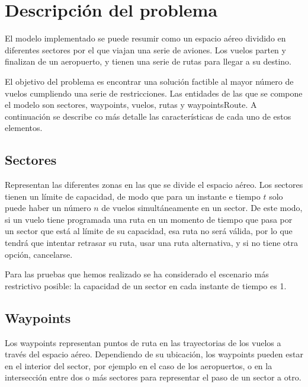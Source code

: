 \chapter{Descripción del problema}
\label{descripción}
El modelo implementado se puede resumir como un espacio aéreo dividido en diferentes sectores por el que viajan una serie de aviones. Los vuelos parten y finalizan de un aeropuerto, y tienen una serie de rutas para llegar a su destino.

El objetivo del problema es encontrar una solución factible al mayor número de vuelos cumpliendo una serie de restricciones. Las entidades de las que se compone el modelo son sectores, waypoints, vuelos, rutas y waypointsRoute. A continuación se describe co más detalle las características de cada uno de estos elementos.


\section{Sectores}
Representan las diferentes zonas en las que se divide el espacio aéreo. Los sectores tienen un límite de capacidad, de modo que para un instante e tiempo $t$ solo puede haber un número $n$ de vuelos simultáneamente en un sector. De este modo, si un vuelo tiene programada una ruta en un momento de tiempo que pasa por un sector que está al límite de su capacidad, esa ruta no será válida, por lo que tendrá que intentar retrasar su ruta, usar una ruta alternativa, y si no tiene otra opción, cancelarse.

Para las pruebas que hemos realizado se ha considerado el escenario más restrictivo posible: la capacidad de un sector en cada instante de tiempo es 1.

\section{Waypoints}
Los waypoints representan puntos de ruta en las trayectorias de los vuelos a través del espacio aéreo. Dependiendo de su ubicación, los waypoints pueden estar en el interior del sector, por ejemplo en el caso de los aeropuertos, o en la intersección entre dos o más sectores para representar el paso de un sector a otro.


